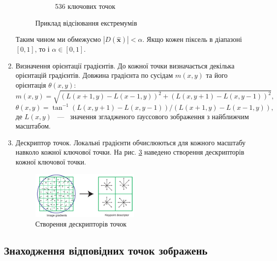 \begin{enumerate}
\begin{figure}[H]
\begin{subfigure}[c]{0.3\textwidth}
                  \caption{ 536 ключових точок
                      \label{fig:swift5}
                  }
              \end{subfigure}
              \caption{Приклад відсіювання екстремумів \cite{sift}
                  \label{fig:sift45}
              }
          \end{figure}
          Таким чином  ми обмежуємо $|D(\widehat{\boldsymbol{x}})| < \alpha$.
          Якщо кожен піксель в діапазоні $[0,1]$, то і
          $ \alpha \in [0,1]$.
    \item Визначення орієнтації градієнтів. 
          До кожної точки визначається декілька орієнтацій градієнтів.
          Довжина градієнта по сусідам $m(x,y)$ та його орієнтація $\theta(x,y)$:
          \begin{equation*}
              m(x,y) = \sqrt{(L(x+1,y) - L(x-1,y))^2 + (L(x,y+1) - L(x,y-1))^2},
          \end{equation*}
          \begin{equation*}
              \theta(x,y) = \tan^{-1} (L(x,y+1) - L(x,y-1))/(L(x+1,y) - L(x-1,y)),
          \end{equation*}
          де $L(x,y)$ ~---~ значення згладженого ґауссового зображення з найближчим масштабом.

    \item Дескриптор точок. 
          Локальні градієнти обчислюються для кожного масштабу навколо кожної ключової точки.
          На рис. \ref{fig:swift6} наведено створення дескрипторів кожної ключової точки.
          \begin{figure}[H]
              \centering
              \includegraphics[width=0.5\textwidth]{images/sift6}
              \caption{Створення дескрипторів точок \cite{sift}
                  \label{fig:swift6}
              }
          \end{figure}
\end{enumerate}

\subsection{Знаходження відповідних точок зображень}

